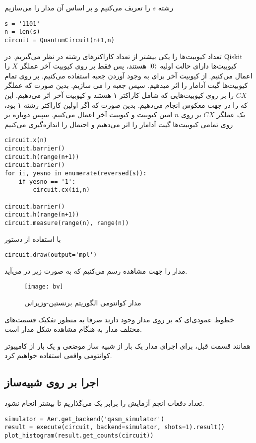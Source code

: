 \documentclass[a4paper,11pt,oneside,openany]{iut-thesis}
\begin{document}
رشته $s$ را تعریف می‌کنیم و بر اساس آن مدار را می‌سازیم
\begin{latin}
\begin{lstlisting}[style=Mypython]
s = '1101'
n = len(s)
circuit = QuantumCircuit(n+1,n)
\end{lstlisting}
\end{latin}
تعداد کیوبیت‌ها را یکی بیشتر از تعداد کاراکترهای رشته در نظر می‌گیریم. در Qiskit کیوبیت‌ها دارای حالت اولیه $\ket 0$ هستند، پس فقط بر روی کیوبیت آخر عملگر $X$ را اعمال می‌کنیم. از کیوبیت آخر برای به وجود آوردن جعبه استفاده می‌کنیم. بر روی تمام کیوبیت‌ها گیت آدامار را اثر میدهیم. سپس جعبه را می سازیم. بدین صورت که عملگر $CX$ را بر روی کیوبیت‌هایی که شامل کاراکتر ۱ هستند و کیوبیت آخر اثر می‌دهیم. این که را در جهت معکوس انجام می‌دهیم. بدین صورت که اگر اولین کاراکتر رشته ۱ بود، یک عملگر $CX$ بر روی $n$ امین کیوبیت و کیوبیت آخر اعمال می‌کنیم. سپس دوباره بر روی تمامی کیوبیت‌ها گیت آدامار را اثر می‌دهیم و احتمال را اندازه‌گیری می‌کنیم
\begin{latin}
\begin{lstlisting}[style=Mypython]
circuit.x(n)
circuit.barrier()
circuit.h(range(n+1))
circuit.barrier()
for ii, yesno in enumerate(reversed(s)):
    if yesno == '1':
        circuit.cx(ii,n)

circuit.barrier()
circuit.h(range(n+1))
circuit.measure(range(n), range(n))
\end{lstlisting}
\end{latin}
با استفاده از دستور

\begin{latin}
\begin{lstlisting}[style=Mypython]
circuit.draw(output='mpl')
\end{lstlisting}
\end{latin}
مدار را جهت مشاهده رسم می‌کنیم که به صورت زیر در می‌آید.
\begin{figure}[h]
	\centering
	\texttt{[image: bv]}
	\caption{
	مدار کوانتومی الگوریتم برنستین-وزیرانی
	}
	\label{bv}
\end{figure}
خطوط عمودی‌ای که بر روی مدار وجود دارند صرفا به منظور تفکیک قسمت‌های مختلف مدار به هنگام مشاهده شکل مدار است.

همانند قسمت قبل، برای اجرای مدار یک بار از شبیه ساز موضعی و یک بار از کامپیوتر کوانتومی واقعی استفاده خواهیم کرد.

\subsection{
اجرا بر روی شبیه‌ساز
}
تعداد دفعات انجم آزمایش را برابر یک می‌گذاریم تا بیشتر انجام نشود.
\begin{latin}
\begin{lstlisting}[style=Mypython]
simulator = Aer.get_backend('qasm_simulator')
result = execute(circuit, backend=simulator, shots=1).result()
plot_histogram(result.get_counts(circuit))
\end{lstlisting}
\end{latin}
\end{document}
